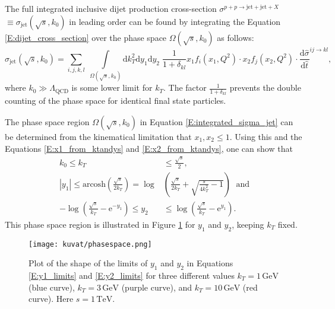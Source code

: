 \documentclass[a4paper, twoside, english, 12pt]{report}
\begin{document}
\begin{sloppypar}
The full integrated inclusive dijet production cross-section $\sigma^{p+p\rightarrow\text{jet}+\text{jet}+X} $ $\equiv \sigma_{\text{jet}}(\sqrt{s},k_0)$ in leading order can be found by integrating the Equation \eqref{E:dijet_cross_section} over the phase space $\Omega(\sqrt{s},k_0)$ as follows:
\begin{equation}\label{E:integrated_sigma_jet}
\sigma_{\text{jet}}(\sqrt{s},k_0) = \sum_{i,j,k,l}\;\int\limits_{\Omega(\sqrt{s},k_0)}\text{d}k_T^2\text{d}y_1\text{d}y_2\; \frac{1}{1+\delta_{kl}} x_1f_i(x_1,Q^2)\cdot x_2f_j(x_2,Q^2) \cdot\frac{\text{d}\hat{\sigma}}{\text{d}\hat{t}}^{ij\rightarrow kl},
\end{equation}
where $k_0 \gg \Lambda_{\text{QCD}}$ is some lower limit for $k_T$. The factor $\frac{1}{1+\delta_{kl}}$ prevents the double counting of the phase space for identical final state particles.
\end{sloppypar}

The phase space region $\Omega(\sqrt{s},k_0)$ in Equation \eqref{E:integrated_sigma_jet} can be determined from the kinematical limitation that $x_1, x_2 \leq 1$. Using this and the Equations \eqref{E:x1_from_ktandys} and \eqref{E:x2_from_ktandys}, one can show that 
\begin{align}
k_0 \leq k_T &\leq \frac{\sqrt{s}}{2}, \label{E:kt_limit} \\[1em]
|y_1| \leq \text{arcosh}\left(\frac{\sqrt{s}}{2k_T}\right) = \log&\left(\frac{\sqrt{s}}{2k_T}+\sqrt{\frac{s}{4k_T^2}-1}\right)\; \text{ and} \label{E:y1_limits} \\[1em]
-\log\left(\frac{\sqrt{s}}{k_T}-\mathrm{e}^{-y_1}\right) \leq y_2 &\leq \log\left(\frac{\sqrt{s}}{k_T}-\mathrm{e}^{y_1}\right)  \label{E:y2_limits} .
\end{align}
This phase space region is illustrated in Figure \ref{F:phasespace} for $y_1$ and $y_2$, keeping $k_T$ fixed.

\begin{figure}[t!]
	\centering
	\texttt{[image: kuvat/phasespace.png]}	
	\caption{Plot of the shape of the limits of $y_1$ and $y_2$ in Equations \eqref{E:y1_limits} and \eqref{E:y2_limits} for three different values $k_T=1\,\text{GeV}$ (blue curve), $k_T=3\,\text{GeV}$ (purple curve), and $k_T=10\,\text{GeV}$ (red curve). Here $s=1\,\text{TeV}$.}
	\label{F:phasespace}
\end{figure}
\end{document}

